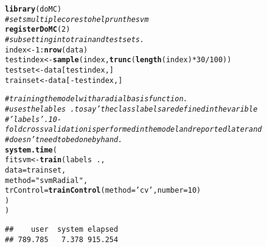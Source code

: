 \documentclass[titlepage]{article}\usepackage[]{graphicx}\usepackage[]{color}
\makeatletter
\newcommand{\hlnum}[1]{\textcolor[rgb]{0.686,0.059,0.569}{#1}}%
\newcommand{\hlstr}[1]{\textcolor[rgb]{0.192,0.494,0.8}{#1}}%
\newcommand{\hlcom}[1]{\textcolor[rgb]{0.678,0.584,0.686}{\textit{#1}}}%
\newcommand{\hlopt}[1]{\textcolor[rgb]{0,0,0}{#1}}%
\newcommand{\hlstd}[1]{\textcolor[rgb]{0.345,0.345,0.345}{#1}}%
\newcommand{\hlkwb}[1]{\textcolor[rgb]{0.69,0.353,0.396}{#1}}%
\newcommand{\hlkwc}[1]{\textcolor[rgb]{0.333,0.667,0.333}{#1}}%
\newcommand{\hlkwd}[1]{\textcolor[rgb]{0.737,0.353,0.396}{\textbf{#1}}}%
\newenvironment{kframe}{%
 \def\at@end@of@kframe{}%
 \ifinner\ifhmode%
  \def\at@end@of@kframe{\end{minipage}}%
  \begin{minipage}{\columnwidth}%
 \fi\fi%
 \def\FrameCommand##1{\hskip\@totalleftmargin \hskip-\fboxsep
 \colorbox{shadecolor}{##1}\hskip-\fboxsep
     \hskip-\linewidth \hskip-\@totalleftmargin \hskip\columnwidth}%
 \MakeFramed {\advance\hsize-\width
   \@totalleftmargin\z@ \linewidth\hsize
   \@setminipage}}%
 {\par\unskip\endMakeFramed%
 \at@end@of@kframe}
\newenvironment{knitrout}{}{} %
\makeatother
\begin{document}
\begin{knitrout}
\color{fgcolor}\begin{kframe}
\begin{alltt}
\hlkwd{library}\hlstd{(doMC)}
\hlcom{# sets multiple cores to help run the svm}
\hlkwd{registerDoMC}\hlstd{(}\hlnum{2}\hlstd{)}
\hlcom{# subsetting into train and test sets.}
\hlstd{index} \hlkwb{<-} \hlnum{1}\hlopt{:}\hlkwd{nrow}\hlstd{(data)}
\hlstd{testindex} \hlkwb{<-} \hlkwd{sample}\hlstd{(index,} \hlkwd{trunc}\hlstd{(}\hlkwd{length}\hlstd{(index)}\hlopt{*}\hlnum{30}\hlopt{/}\hlnum{100}\hlstd{))}
\hlstd{testset} \hlkwb{<-} \hlstd{data[testindex,]}
\hlstd{trainset} \hlkwb{<-} \hlstd{data[}\hlopt{-}\hlstd{testindex,]}

\hlcom{# training the model with a radial basis function.}
\hlcom{# uses the lables ~ . to say 'the class labels are defined in the varible}
\hlcom{# 'labels'. 10-fold cross validation is performed in the model and reported later and}
\hlcom{# doesn't need to be done by hand.}
\hlkwd{system.time}\hlstd{(}
  \hlstd{fitsvm} \hlkwb{<-} \hlkwd{train}\hlstd{(labels} \hlopt{~} \hlstd{.,}
                 \hlkwc{data} \hlstd{= trainset,}
                 \hlkwc{method}\hlstd{=}\hlstr{"svmRadial"}\hlstd{,}
                 \hlkwc{trControl}\hlstd{=}\hlkwd{trainControl}\hlstd{(}\hlkwc{method}\hlstd{=}\hlstr{'cv'}\hlstd{,} \hlkwc{number} \hlstd{=} \hlnum{10}\hlstd{)}
                 \hlstd{)}
\hlstd{)}
\end{alltt}
\begin{verbatim}
##    user  system elapsed 
## 789.785   7.378 915.254
\end{verbatim}
\end{kframe}
\end{knitrout}
\end{document}
